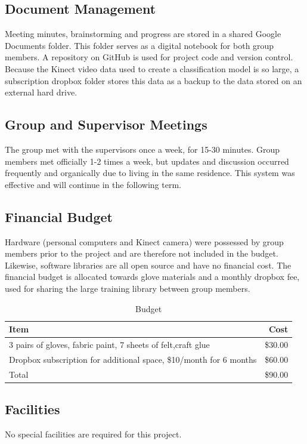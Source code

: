 \documentclass[12pt]{article}
\begin{document}
\subsection{Document Management}
Meeting minutes, brainstorming and progress are stored in a shared Google Documents folder. This folder serves as a digital notebook for both group members. A repository on GitHub is used for project code and version control. Because the Kinect video data used to create a classification model is so large, a subscription dropbox folder stores this data as a backup to the data stored on an external hard drive. 

\subsection{Group and Supervisor Meetings}
The group met with the supervisors once a week, for 15-30 minutes. Group members met officially 1-2 times a week, but updates and discussion occurred frequently and organically due to living in the same residence. This system was effective and will continue in the following term. 

\subsection{Financial Budget}
Hardware (personal computers and Kinect camera) were possessed by group members prior to the project and are therefore not included in the budget. Likewise, software libraries are all open source and have no financial cost. The financial budget is allocated towards glove materials and a monthly dropbox fee, used for sharing the large training library between group members. 

\begin{table}[h!]
\centering
\caption{Budget}
\label{table:Budget}
\begin{tabular}{l r}

\textbf{Item}  & \textbf{Cost} \\ \hline
3 pairs of gloves, fabric paint, 7 sheets of felt,craft glue & \$30.00 \\
Dropbox subscription for additional space, \$10/month for 6 months & \$60.00 \\ \hline
Total & \$90.00 \\
\end{tabular}
\end{table}

\subsection{Facilities}
No special facilities are required for this project.
\end{document}
